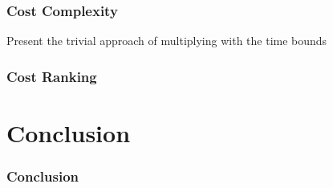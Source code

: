 \documentclass{beamer}
\begin{document}
\begin{frame}
  \frametitle{Cost Complexity}
  Present the trivial approach of multiplying with the time bounds
\end{frame}

\begin{frame}
  \frametitle{Cost Ranking}
\end{frame}

\section{Conclusion}

\begin{frame}
  \frametitle{Conclusion}
\end{frame}
\end{document}

